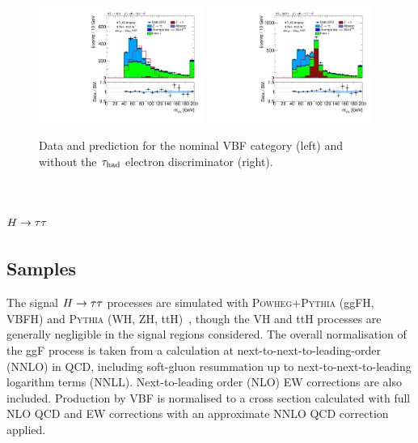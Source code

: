\begin{figure}[tp]
  \includegraphics[width=0.48\textwidth]{figures/backgrounds/mvis-with-eveto.pdf}
  \includegraphics[width=0.48\textwidth]{figures/backgrounds/mvis-without-eveto.pdf}
  \caption{Data and prediction for the nominal VBF category (left) and without the $\tau_\text{had}$ electron discriminator (right).}
  \label{fig:backgrounds-zll}
\end{figure}

\section{$H\rightarrow\tau\tau$}
\label{sec:backgrounds-htautau}

\subsection{Samples}

The signal $H\rightarrow\tau\tau$ processes are simulated with \textsc{Powheg+Pythia} (ggFH, VBFH) and \textsc{Pythia} (WH, ZH, ttH)~\cite{HIGG-2013-32}, though the VH and ttH processes are generally negligible in the signal regions considered. The overall normalisation of the  ggF process is taken from a calculation at next-to-next-to-leading-order (NNLO) in QCD, including soft-gluon resummation up to next-to-next-to-leading logarithm terms (NNLL). Next-to-leading order (NLO) EW corrections are also included.  Production by VBF is normalised to a cross section calculated with full NLO QCD and EW corrections with an approximate NNLO QCD correction applied.

